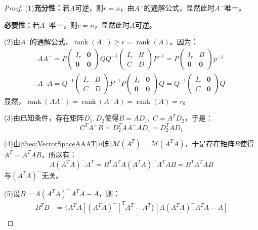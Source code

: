 \begin{proof}
	(1)\textbf{充分性：}若$A$可逆，则$r=n$，由$A^-$的通解公式，显然此时$A^-$唯一。\par
	\textbf{必要性：}若$A^-$唯一，则$r=n$，显然此时$A$可逆。\par
	(2)由$A^-$的通解公式，$\operatorname{rank}(A^-)\geqslant r=\operatorname{rank}(A)$。因为：
	\begin{gather*}
		AA^-=P
		\begin{pmatrix}
			I_r & \mathbf{0} \\
			\mathbf{0} & \mathbf{0}
		\end{pmatrix}
		QQ^{-1}
		\begin{pmatrix}
			I_r & B \\
			C & D
		\end{pmatrix}
		P^{-1}
		=P
		\begin{pmatrix}
			I_r & B \\
			\mathbf{0} & \mathbf{0}
		\end{pmatrix}
		p^{-1} \\
		A^-A=Q^{-1}
		\begin{pmatrix}
			I_r & B \\
			C & D
		\end{pmatrix}
		P^{-1}P
		\begin{pmatrix}
			I_r & \mathbf{0} \\
			\mathbf{0} & \mathbf{0}
		\end{pmatrix}
		Q
		=Q^{-1}
		\begin{pmatrix}
			I_r & \mathbf{0} \\
			C & \mathbf{0}
		\end{pmatrix}
		Q
	\end{gather*}
	显然，$\operatorname{rank}(AA^-)=\operatorname{rank}(A^-A)=\operatorname{rank}(A)=r$。\par
	(3)由已知条件，存在矩阵$D_1,D_2$使得$B=AD_1,\;C=A^TD_2$，于是：
	\begin{equation*}
		C^TA^-B=D_2^TAA^-AD_1=D_2^TAD_1
	\end{equation*}\par
	(4)由\cref{theo:VectorSpaceAAAT}可知$\mathcal{M}(A^T)=\mathcal{M}(A^TA)$，于是存在矩阵$B$使得$A^T=A^TAB$，所以有：
	\begin{equation*}
		A(A^TA)^-A^T=B^TA^TA(A^TA)^-A^TAB=B^TA^TAB
	\end{equation*}
	与$(A^TA)^-$无关。\par
	(5)设$B=A(A^TA)^-A^TA-A$，则：
	\begin{align*}
		B^TB
		&=\{A^TA[(A^TA)^-]^TA^T-A^T\}[A(A^TA)^-A^TA-A] \\

\end{align*}
\end{proof}
